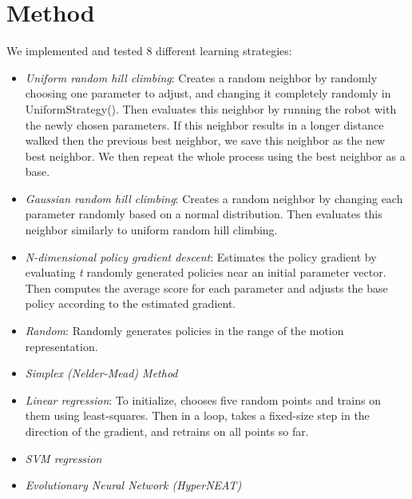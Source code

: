 \section{Method}
We implemented and tested 8 different learning strategies:
\begin{itemize}
\item \emph{Uniform random hill climbing}: Creates a random neighbor by
  randomly choosing one parameter to adjust, and changing it completely 
  randomly in UniformStrategy(). Then evaluates this neighbor by running 
  the robot with the newly chosen parameters. If this neighbor results in a
  longer distance walked then the previous best neighbor, we save this
  neighbor as the new best neighbor. We then repeat the whole process
  using the best neighbor as a base.
\item \emph{Gaussian random hill climbing}: Creates a random neighbor by
  changing each parameter randomly based on a normal distribution. Then
  evaluates this neighbor similarly to uniform random hill climbing.
\item \emph{N-dimensional policy gradient descent}: Estimates the policy
  gradient by evaluating \emph{t} randomly generated policies
  near an initial parameter vector. Then computes the average score for
  each parameter and adjusts the base policy according to the estimated
  gradient.
\item \emph{Random}: Randomly generates policies in the range of the motion
representation.
\item \emph{Simplex (Nelder-Mead) Method}
\item \emph{Linear regression}: To initialize, chooses five random points
and trains on them using least-squares. Then in a loop, takes a fixed-size
step in the direction of the gradient, and retrains on all points so far.
\item \emph{SVM regression}
\item \emph{Evolutionary Neural Network (HyperNEAT)\cite{2}}
\end{itemize}

